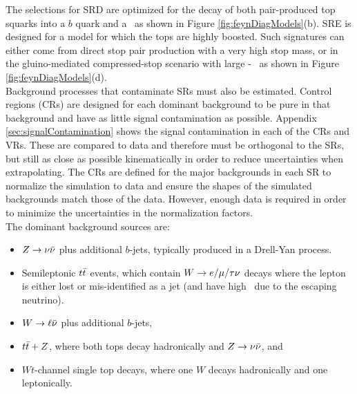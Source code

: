 The selections for SRD are optimized for the decay of both pair-produced top squarks into a $b$ quark and a \chinoonepm\ as shown in Figure \ref{fig:feynDiagModels}(b). SRE is designed for a model for which the tops are highly boosted. Such signatures can either come from direct stop pair production with a very high stop mass, or in the gluino-mediated compressed-stop scenario with large \mgluino - \mstop\ as shown in Figure \ref{fig:feynDiagModels}(d). \\


Background processes that contaminate SRs must also be estimated.  Control regions (CRs) are designed for each dominant background to be pure in that background and have as little signal contamination as possible.  Appendix \ref{sec:signalContamination} shows the signal contamination in each of the CRs and VRs.  These are compared to data and therefore must be orthogonal to the SRs, but still as close as possible kinematically in order to reduce uncertainties when extrapolating.  The CRs are defined for the major backgrounds in each SR to normalize the simulation to data and ensure the shapes of the simulated backgrounds match those of the data.  However, enough data is required in order to minimize the uncertainties in the normalization factors. \\

The dominant background sources are:

\begin{itemize}
\item $Z\rightarrow \nu \bar{\nu}$ plus additional $b$-jets, typically produced in a Drell-Yan process.  
\item Semileptonic $t\bar{t}$ events, which contain $W \rightarrow e/\mu/\tau \nu$ decays where the lepton is either lost or mis-identified as a jet (and have high \met\ due to the escaping neutrino).
\item $W\rightarrow \ell \bar{\nu}$ plus additional $b$-jets, 
\item $t\bar{t}+Z$, where both tops decay hadronically and $Z\rightarrow \nu \bar{\nu}$, and
\item $Wt$-channel single top decays, where one $W$ decays hadronically and one leptonically.
\end{itemize}

